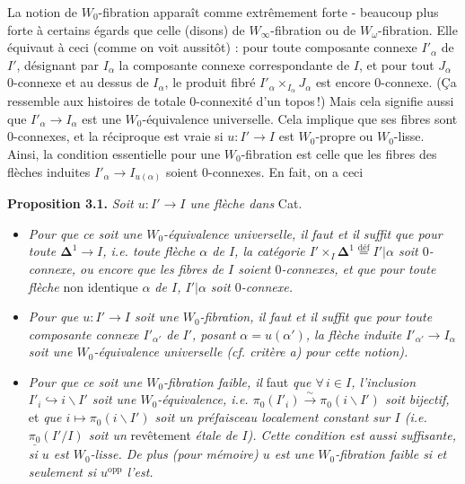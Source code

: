\documentclass[11pt]{article}
\newcommand{\printedpage}[1]{\marginpar{\footnotesize p.~#1}}
\newcommand{\msp}[1]{\marginpar{\footnotesize [#1]}}
\newcommand{\def}{\overset{\text{déf}}{=}}
\begin{document}
\printedpage{27}
\msp{page 41}
La notion de $W_0$-fibration apparaît comme extrêmement forte - beaucoup plus forte à certains égards que celle (disons) de $W_\infty$-fibration ou de $W_\omega$-fibration. Elle équivaut à ceci (comme on voit aussitôt) : pour toute composante connexe $I'_\alpha$ de $I'$, désignant par $I_\alpha$ la composante connexe correspondante de $I$, et pour tout $J_\alpha$ 0-connexe et au dessus de $I_\alpha$, le produit fibré $I'_\alpha \times_{I_\alpha} J_\alpha$ est encore 0-connexe. (Ça ressemble aux histoires de totale 0-connexité d'un topos\,!) Mais cela signifie aussi que $I'_\alpha \longrightarrow I_\alpha$ est une $W_0$-équivalence universelle. Cela implique que ses fibres sont 0-connexes, et la réciproque est vraie si $u : I' \longrightarrow I$ est $W_0$-propre ou $W_0$-lisse. Ainsi, la condition essentielle pour une $W_0$-fibration est celle que les fibres des flèches induites $I'_\alpha \longrightarrow I_{u(\alpha)}$ soient 0-connexes. En fait, on a ceci

\noindent\textbf{Proposition 3.1.} \textit{Soit $u : I' \longrightarrow I$ une flèche dans} Cat.
\begin{itemize}
\item[\textit{a)}] \textit{Pour que ce soit une $W_0$-équivalence universelle, il faut et il suffit que pour toute $\mathbf{\Delta}^1 \longrightarrow I$, i.e. toute flèche $\alpha$ de $I$, la catégorie $I' \times_I \mathbf{\Delta}^1 \def I'|\alpha$ soit $0$-connexe, ou encore que les fibres de $I$ soient $0$-connexes, et que pour toute flèche} non identique \textit{$\alpha$ de $I$, $I'|\alpha$ soit $0$-connexe.}
\item[\textit{b)}] \textit{Pour que $u : I' \longrightarrow I$ soit une $W_0$-fibration, il faut et il suffit que pour toute composante connexe $I'_{\alpha'}$ de}
\msp{page 42}
\textit{$I'$, posant $\alpha = u(\alpha')$, la flèche induite $I'_{\alpha'} \longrightarrow I_\alpha$ soit une $W_0$-équivalence universelle (cf. critère a) pour cette notion).}
\item[\textit{c)}] \textit{Pour que ce soit une $W_0$-fibration faible, il} faut \textit{que $\forall\, i \in I$, l'inclusion $I'_i \hookrightarrow i\backslash I'$ soit une $W_0$-équivalence, i.e. $\pi_0(I'_i) \xrightarrow{\;\sim\;} \pi_0(i\backslash I')$ soit bijectif,} et \textit{que $i \longmapsto \pi_0(i\backslash I')$ soit un préfaisceau localement constant sur $I$ (i.e. $\underline{\pi_0}(I'/I)$ soit un} revêtement \textit{étale de $I$). Cette condition est aussi suffisante, si $u$ est $W_0$-lisse. De plus (pour mémoire) $u$ est une $W_0$-fibration faible si et seulement si $u^{\mathrm{opp}}$ l'est.}
\end{itemize}
\end{document}
